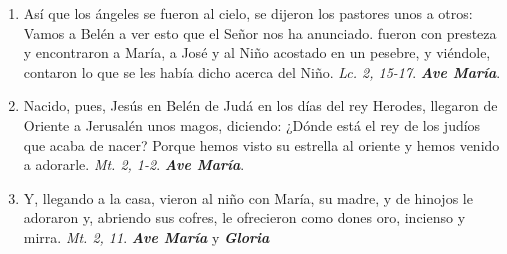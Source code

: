 \documentclass[../../devocionario.tex]{subfiles}
\begin{document}
\begin{enumerate}
        \item Así que los ángeles se fueron al cielo, se dijeron los pastores unos a otros: Vamos a Belén a ver esto que el Señor nos ha anunciado. fueron
            con presteza y encontraron a María, a José y al Niño acostado en un pesebre, y viéndole, contaron lo que se les había dicho acerca del
            Niño. \emph{Lc. 2, 15-17}. \textbf{\emph{Ave María}}.   

        \item Nacido, pues, Jesús en Belén de Judá en los días del rey Herodes, llegaron de Oriente a Jerusalén unos magos, diciendo: ¿Dónde está el rey de los judíos
            que acaba de nacer? Porque hemos visto su estrella al oriente y hemos venido a adorarle. \emph{Mt. 2, 1-2}. \textbf{\emph{Ave María}}.            
        
        \item Y, llegando a la casa, vieron al niño con María, su madre, y de hinojos le adoraron y, abriendo sus cofres, le ofrecieron como dones oro, incienso y mirra. 
            \emph{Mt. 2, 11}. \textbf{\emph{Ave María}} y \textbf{\emph{Gloria}}
    
    \end{enumerate}
\end{document}
